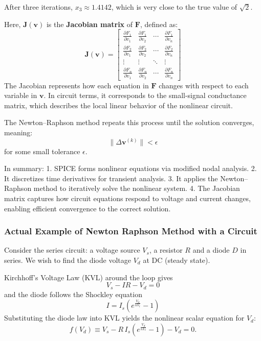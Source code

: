 \documentclass[a4paper,12pt]{article}
\begin{document}
After three iterations, \(x_3 \approx 1.4142\), which is very close to the true value of \(\sqrt{2}\).

Here, \(\mathbf{J}(\mathbf{v})\) is the \textbf{Jacobian matrix} of \(\mathbf{F}\), defined as:
\begin{equation}
\mathbf{J}(\mathbf{v}) =
\begin{bmatrix}
\frac{\partial F_1}{\partial v_1} & \frac{\partial F_1}{\partial v_2} & \cdots & \frac{\partial F_1}{\partial v_n} \\
\frac{\partial F_2}{\partial v_1} & \frac{\partial F_2}{\partial v_2} & \cdots & \frac{\partial F_2}{\partial v_n} \\
\vdots & \vdots & \ddots & \vdots \\
\frac{\partial F_n}{\partial v_1} & \frac{\partial F_n}{\partial v_2} & \cdots & \frac{\partial F_n}{\partial v_n}
\end{bmatrix}
\end{equation}
The Jacobian represents how each equation in \(\mathbf{F}\) changes with respect to each variable in \(\mathbf{v}\). In circuit terms, it corresponds to the small-signal conductance matrix, which describes the local linear behavior of the nonlinear circuit.

The Newton–Raphson method repeats this process until the solution converges, meaning:
\begin{equation}
\|\Delta \mathbf{v}^{(k)}\| < \epsilon
\end{equation}
for some small tolerance \(\epsilon\).

In summary:
1. SPICE forms nonlinear equations via modified nodal analysis.  
2. It discretizes time derivatives for transient analysis.  
3. It applies the Newton–Raphson method to iteratively solve the nonlinear system.  
4. The Jacobian matrix captures how circuit equations respond to voltage and current changes, enabling efficient convergence to the correct solution.

\subsubsection{Actual Example of Newton Raphson Method with a Circuit}

Consider the series circuit: a voltage source \(V_s\), a resistor \(R\) and a diode \(D\) in series. We wish to find the diode voltage \(V_d\) at DC (steady state).

Kirchhoff's Voltage Law (KVL) around the loop gives
\begin{equation}
V_s - I R - V_d = 0
\end{equation}
and the diode follows the Shockley equation
\begin{equation}
I = I_s\!\left(e^{\frac{V_d}{nV_t}} - 1\right)
\end{equation}
Substituting the diode law into KVL yields the nonlinear scalar equation for \(V_d\):
\begin{equation}
f(V_d)\equiv V_s - R\,I_s\!\left(e^{\frac{V_d}{nV_t}} - 1\right) - V_d = 0.
\end{equation}
\end{document}
